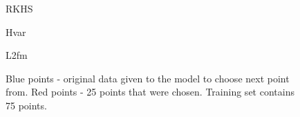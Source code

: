 \documentclass[a4paper]{article}
\begin{document}
\begin{figure}[h]
\begin{minipage}[h]{0.49\linewidth}
\end{minipage}
\hfill
\begin{minipage}[h]{0.49\linewidth}
 RKHS
\end{minipage}
\vfill
\begin{minipage}[h]{0.49\linewidth}
 Hvar
\end{minipage}
\hfill
\begin{minipage}[h]{0.49\linewidth}
 L2fm
\end{minipage}
\caption{Blue points - original data given to the model to choose next point from. Red points - 25 points that were chosen. Training set contains 75 points.}
\label{scoreplots}
\end{figure}
\end{document}
